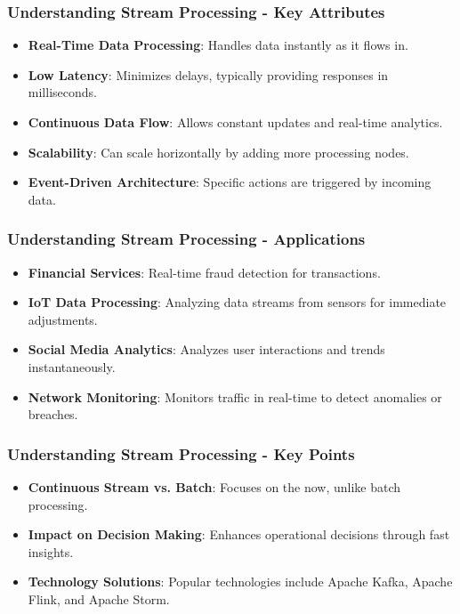 \documentclass{beamer}
\begin{document}
\begin{frame}[fragile]
    \frametitle{Understanding Stream Processing - Key Attributes}
    \begin{itemize}
        \item \textbf{Real-Time Data Processing}: Handles data instantly as it flows in.
        \item \textbf{Low Latency}: Minimizes delays, typically providing responses in milliseconds.
        \item \textbf{Continuous Data Flow}: Allows constant updates and real-time analytics.
        \item \textbf{Scalability}: Can scale horizontally by adding more processing nodes.
        \item \textbf{Event-Driven Architecture}: Specific actions are triggered by incoming data.
    \end{itemize}
\end{frame}

\begin{frame}[fragile]
    \frametitle{Understanding Stream Processing - Applications}
    \begin{itemize}
        \item \textbf{Financial Services}: Real-time fraud detection for transactions.
        \item \textbf{IoT Data Processing}: Analyzing data streams from sensors for immediate adjustments.
        \item \textbf{Social Media Analytics}: Analyzes user interactions and trends instantaneously.
        \item \textbf{Network Monitoring}: Monitors traffic in real-time to detect anomalies or breaches.
    \end{itemize}
\end{frame}

\begin{frame}[fragile]
    \frametitle{Understanding Stream Processing - Key Points}
    \begin{itemize}
        \item \textbf{Continuous Stream vs. Batch}: Focuses on the now, unlike batch processing.
        \item \textbf{Impact on Decision Making}: Enhances operational decisions through fast insights.
        \item \textbf{Technology Solutions}: Popular technologies include Apache Kafka, Apache Flink, and Apache Storm.
    \end{itemize}
\end{frame}
\end{document}
